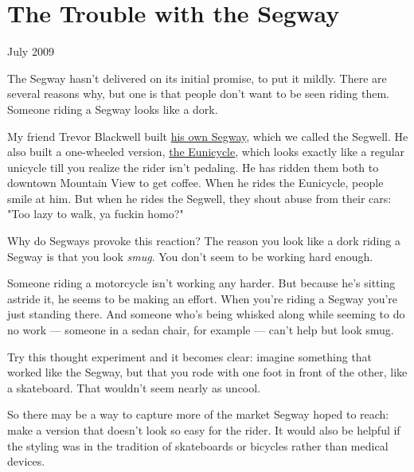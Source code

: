 \chapter{The Trouble with the Segway}


            
              
                

July 2009

The Segway hasn't delivered on its
                  initial promise, to put it mildly. There are several reasons
                  why, but one is that people don't want to be seen riding them.
                  Someone riding a Segway looks like a dork.

My
                  friend Trevor Blackwell built
                  \href{http://tlb.org/\#scooter}{his own Segway}, which we
                  called the Segwell. He also built a one-wheeled version,
                  \href{http://tlb.org/\#eunicycle}{the Eunicycle}, which
                  looks exactly like a regular unicycle till you realize the
                  rider isn't pedaling. He has ridden them both to downtown
                  Mountain View to get coffee. When he rides the Eunicycle,
                  people smile at him. But when he rides the Segwell, they shout
                  abuse from their cars: "Too lazy to walk, ya fuckin homo?"

Why
                  do Segways provoke this reaction? The reason you look like a
                  dork riding a Segway is that you look \emph{smug}. You don't
                  seem to be working hard enough.

Someone riding a
                  motorcycle isn't working any harder. But because he's sitting
                  astride it, he seems to be making an effort. When you're
                  riding a Segway you're just standing there. And someone who's
                  being whisked along while seeming to do no work ---
                  someone in a sedan chair, for example --- can't help but
                  look smug.

Try this thought experiment and it
                  becomes clear: imagine something that worked like the Segway,
                  but that you rode with one foot in front of the other, like a
                  skateboard. That wouldn't seem nearly as uncool.

So
                  there may be a way to capture more of the market Segway hoped
                  to reach: make a version that doesn't look so easy for the
                  rider. It would also be helpful if the styling was in the
                  tradition of skateboards or bicycles rather than medical
                  devices.

